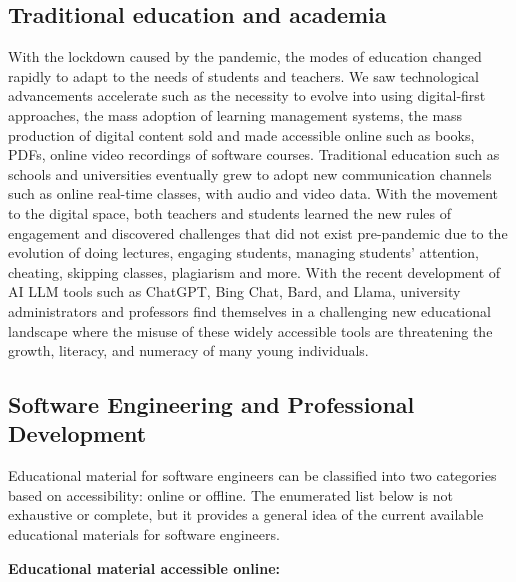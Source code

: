 \documentclass[journal, onecolumn]{IEEEtran}
\begin{document}
\subsection{Traditional education and academia}
With the lockdown caused by the pandemic, the modes of education changed rapidly to 
adapt to the needs of students and teachers. We saw technological advancements 
accelerate such as the necessity to evolve into using digital-first approaches, the
mass adoption of learning management systems, the mass production of digital content 
sold and made accessible online such as books, PDFs, online video recordings of 
software courses. 
Traditional education such as schools and universities eventually grew to adopt 
new communication channels such as online real-time classes, with audio and video data. 
With the movement to the digital space, both teachers and students learned the new 
rules of engagement and discovered challenges that did not exist pre-pandemic due to
the evolution of doing lectures, engaging students, managing students' attention, 
cheating, skipping classes, plagiarism and more.
With the recent development of AI LLM tools such as ChatGPT, Bing Chat, Bard, and 
Llama, university administrators and professors find themselves in a challenging
new educational landscape where the misuse of these widely accessible tools are 
threatening the growth, literacy, and numeracy of many young individuals.

\subsection{Software Engineering and Professional Development}
\label{sec:edu_materials}
Educational material for software engineers can be classified into two categories
 based on accessibility: online or offline. The enumerated list below is not exhaustive or complete, 
 but it provides a general idea of the current available educational materials for software engineers.

\textbf{Educational material accessible online:}
\end{document}
